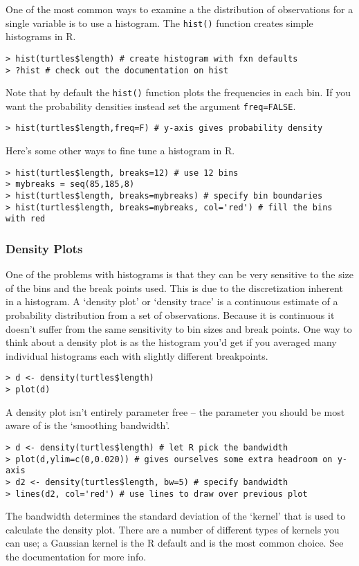 One of the most common ways to examine a the distribution of
observations for a single variable is to use a histogram. The
\lstinline!hist()! function creates simple histograms in R.

\begin{lstlisting}
> hist(turtles$length) # create histogram with fxn defaults
> ?hist # check out the documentation on hist
\end{lstlisting}
Note that by default the \lstinline!hist()! function plots the
frequencies in each bin. If you want the probability densities instead
set the argument \lstinline!freq=FALSE!.

\begin{lstlisting}
> hist(turtles$length,freq=F) # y-axis gives probability density
\end{lstlisting}
Here's some other ways to fine tune a histogram in R.

\begin{lstlisting}
> hist(turtles$length, breaks=12) # use 12 bins
> mybreaks = seq(85,185,8)
> hist(turtles$length, breaks=mybreaks) # specify bin boundaries   
> hist(turtles$length, breaks=mybreaks, col='red') # fill the bins with red  
\end{lstlisting}
\subsubsection{Density Plots}

One of the problems with histograms is that they can be very sensitive
to the size of the bins and the break points used. This is due to the
discretization inherent in a histogram. A `density plot' or `density
trace' is a continuous estimate of a probability distribution from a set
of observations. Because it is continuous it doesn't suffer from the
same sensitivity to bin sizes and break points. One way to think about a
density plot is as the histogram you'd get if you averaged many
individual histograms each with slightly different breakpoints.

\begin{lstlisting}
> d <- density(turtles$length)
> plot(d)    
\end{lstlisting}
A density plot isn't entirely parameter free -- the parameter you should
be most aware of is the `smoothing bandwidth'.

\begin{lstlisting}
> d <- density(turtles$length) # let R pick the bandwidth
> plot(d,ylim=c(0,0.020)) # gives ourselves some extra headroom on y-axis
> d2 <- density(turtles$length, bw=5) # specify bandwidth
> lines(d2, col='red') # use lines to draw over previous plot
\end{lstlisting}
The bandwidth determines the standard deviation of the `kernel' that is
used to calculate the density plot. There are a number of different
types of kernels you can use; a Gaussian kernel is the R default and is
the most common choice. See the documentation for more info.

